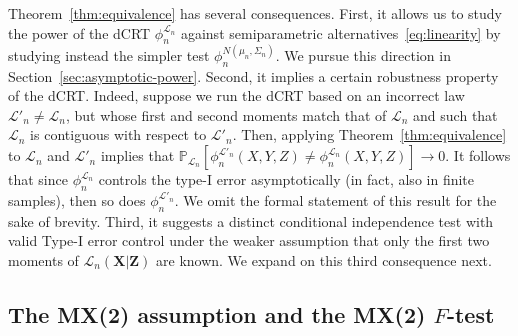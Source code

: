 \documentclass[12pt]{article}
\theoremstyle{definition}
\theoremstyle{remark}
\newcommand{\prx}{\bm X}
\newcommand{\srx}{X}
\newcommand{\prz}{\bm Z}
\newcommand{\srz}{Z}
\newcommand{\sry}{Y}
\begin{document}
Theorem~\ref{thm:equivalence} has several consequences. First, it allows us to study the power of the dCRT $\phi_n^{\mathcal L_n}$ against semiparametric alternatives~\eqref{eq:linearity} by studying instead the simpler test $\phi_n^{N(\mu_n, \Sigma_n)}$. We pursue this direction in Section~\ref{sec:asymptotic-power}. Second, it implies a certain robustness property of the dCRT. Indeed, suppose we run the dCRT based on an incorrect law $\mathcal L'_n \neq \mathcal L_n$, but whose first and second moments match that of $\mathcal L_n$ and such that $\mathcal L_n$ is contiguous with respect to $\mathcal L'_n$. Then, applying Theorem~\ref{thm:equivalence} to $\mathcal L_n$ and $\mathcal L'_n$ implies that $\mathbb P_{\mathcal L_n}[\phi^{\mathcal L'_n}_n(\srx, \sry, \srz) \neq \phi^{\mathcal L_n}_n(\srx, \sry, \srz)] \rightarrow 0$. It follows that since $\phi^{\mathcal L_n}_n$ controls the type-I error asymptotically (in fact, also in finite samples), then so does $\phi^{\mathcal L'_n}_n$. We omit the formal statement of this result for the sake of brevity. Third, it suggests a distinct conditional independence test with valid Type-I error control under the weaker assumption that only the first two moments of $\mathcal L_n(\prx|\prz)$ are known. We expand on this third consequence next.

\subsection{The MX(2) assumption and the MX(2) $F$-test} \label{sec:mx2-f-test}
\end{document}
